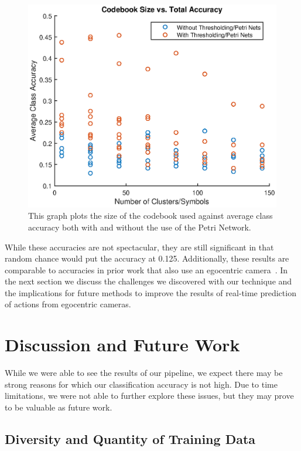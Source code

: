 \documentclass[10pt,twocolumn,letterpaper]{article}
\begin{document}
\begin{figure}[!b]
    \centering
    \includegraphics[width=\columnwidth]{fig/codebook_plot.eps}
    \caption{This graph plots the size of the codebook used against average class accuracy both with and without the use of the Petri Network.}
    \label{fig:graph2}
\end{figure}

While these accuracies are not spectacular, they are still significant in that random chance would put the accuracy at 0.125. Additionally, these results are comparable to accuracies in prior work that also use an egocentric camera~\cite{ren2009egocentric}. In the next section we discuss the challenges we discovered with our technique and the implications for future methods to improve the results of real-time prediction of actions from egocentric cameras.

\section{Discussion and Future Work}

While we were able to see the results of our pipeline, we expect there may be strong reasons for which our classification accuracy is not high. Due to time limitations, we were not able to further explore these issues, but they may prove to be valuable as future work.

\subsection{Diversity and Quantity of Training Data}
\end{document}
